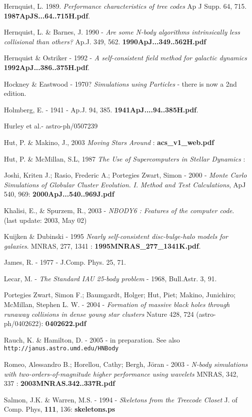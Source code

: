 Hernquist, L. 1989. {\it Performance characteristics of tree codes} Ap J Supp. 64, 715.
{\bf 1987ApJS...64..715H.pdf}.

Hernquist, L. \& Barnes, J. 1990 - 
{\it Are some N-body algorithms intrinsically less collisional than others?}
Ap.J. 349,  562. {\bf 1990ApJ...349..562H.pdf}

Hernquist \& Ostriker - 1992 - {\it A self-consistent field method for galactic dynamics}
{\bf 1992ApJ...386..375H.pdf}.

Hockney \& Eastwood - 1970? {\it Simulations using Particles} - there is now a 2nd edition.

Holmberg, E. - 1941 - Ap.J. 94, 385.
{\bf 1941ApJ....94..385H.pdf}.

Hurley et al.- astro-ph/0507239

Hut, P. \& Makino, J., 2003  {\it Moving Stars Around} :
{\bf acs\_v1\_web.pdf}

Hut, P. \& McMillan, S.L, 1987  {\it The Use of Supercomputers in Stellar Dynamics} :

Joshi, Kriten J.; Rasio, Frederic A.; Portegies Zwart, Simon - 2000 -
{\it Monte Carlo Simulations of Globular Cluster Evolution. I. Method and Test Calculations},
ApJ 540, 969: 
{\bf 2000ApJ...540..969J.pdf}

Khalisi, E., \& Spurzem, R., 2003 - {\it NBODY6 : Features of the computer code}.
(last update: 2003, May 02)

Kuijken \& Dubinski - 1995 {\it Nearly self-consistent disc-bulge-halo models for galaxies}.
MNRAS, 277, 1341 : {\bf 1995MNRAS\_277\_1341K.pdf}.

James, R. - 1977 -  J.Comp. Phys. 25, 71.

Lecar, M. - {\it The Standard IAU 25-body problem} - 1968, Bull.Astr. 3, 91. 

Portegies Zwart, Simon F.; Baumgardt, Holger; Hut, Piet; Makino, Junichiro; McMillan, Stephen L. W. -
2004 - {\it Formation of massive black holes through runaway collisions in dense young star clusters}
Nature 428, 724 (astro-ph/0402622): {\bf 0402622.pdf}

Rauch, K. \& Hamilton, D. - 2005 - in preparation. See also
{\tt http://janus.astro.umd.edu/HNBody}


Romeo, Alessandro B.; Horellou, Cathy; Bergh, Jöran - 2003 - 
{\it N-body simulations with two-orders-of-magnitude higher performance using wavelets}
MNRAS, 342, 337 : {\bf 2003MNRAS.342..337R.pdf}

Salmon, J.K. \& Warren, M.S. - 1994 -
{\it Skeletons from the Treecode Closet} J. of Comp. Phys, {\bf 111}, 136:
{\bf skeletons.ps}


